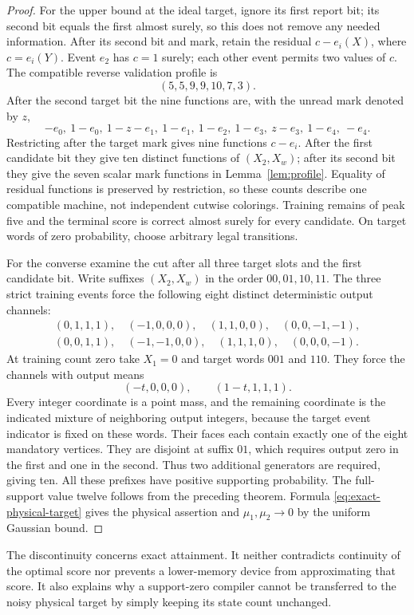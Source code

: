 \begin{proof}
For the upper bound at the ideal target, ignore its first report bit;
its second bit equals the first almost surely, so this does not remove
any needed information. After its second bit and mark, retain the
residual $c-e_i(X)$, where $c=e_i(Y)$. Event $e_2$ has $c=1$ surely;
each other event permits two values of $c$. The compatible reverse
validation profile is
\[
                          (5,5,9,9,10,7,3).
\]
After the second target bit the nine functions are, with the unread
mark denoted by $z$,
\[
 -e_0,\ 1-e_0,\ 1-z-e_1,\ 1-e_1,\ 1-e_2,
 \ 1-e_3,\ z-e_3,\ 1-e_4,\ -e_4.
\]
Restricting after the target mark gives nine functions $c-e_i$.
After the first candidate bit they give ten distinct functions of
$(X_2,X_w)$; after its second bit they give the seven scalar mark
functions in Lemma~\ref{lem:profile}. Equality of residual functions
is preserved by restriction, so these counts describe one compatible
machine, not independent cutwise colorings. Training remains of peak
five and the terminal score is correct almost surely for every
candidate. On target words of zero probability, choose arbitrary legal
transitions.

For the converse examine the cut after all three target slots and the
first candidate bit. Write suffixes $(X_2,X_w)$ in the order
$00,01,10,11$. The three strict training events force the following
eight distinct deterministic output channels:
\[
 \begin{gathered}
 (0,1,1,1),\quad(-1,0,0,0),\quad(1,1,0,0),\quad(0,0,-1,-1),\\
 (0,0,1,1),\quad(-1,-1,0,0),\quad(1,1,1,0),\quad(0,0,0,-1).
 \end{gathered}
\]
At training count zero take $X_1=0$ and target words $001$ and $110$.
They force the channels with output means
\[
                         (-t,0,0,0),\qquad(1-t,1,1,1).
\]
Every integer coordinate is a point mass, and the remaining coordinate
is the indicated mixture of neighboring output integers, because the
target event indicator is fixed on these words. Their faces each contain
exactly one of the eight mandatory vertices. They are disjoint at suffix
$01$, which requires output zero in the first and one in the second.
Thus two additional generators are required, giving ten. All these
prefixes have positive supporting probability. The full-support value
twelve follows from the preceding theorem. Formula
\eqref{eq:exact-physical-target} gives the physical assertion and
$\mu_1,\mu_2\to0$ by the uniform Gaussian bound.
\end{proof}

The discontinuity concerns exact attainment. It neither contradicts
continuity of the optimal score nor prevents a lower-memory device
from approximating that score. It also explains why a support-zero
compiler cannot be transferred to the noisy physical target by simply
keeping its state count unchanged.
